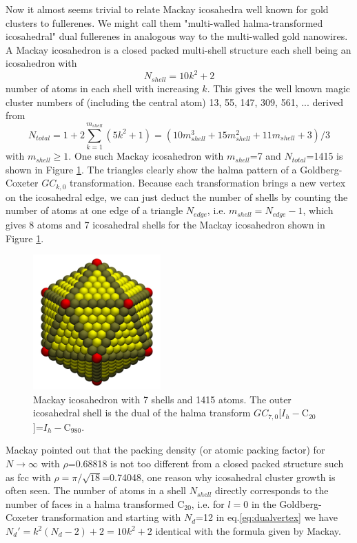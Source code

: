 Now it almost seems trivial to relate Mackay icosahedra\autocite{Mackay-1962} well known for gold clusters\autocite{Nam2002,Wang-Wang-2011} to fullerenes. We might call them "multi-walled halma-transformed icosahedral" dual fullerenes in analogous way to the multi-walled gold nanowires. A Mackay icosahedron is a closed packed multi-shell structure each shell being an icosahedron with
\begin{equation}
  \label{eq:mackay} 
N_{shell}=10k^2+2
\end{equation}
number of atoms in each shell with increasing $k$. This gives the well known magic cluster numbers of (including the central atom) 13, 55, 147, 309, 561, ... derived from
\begin{equation}
  \label{eq:mackaytotal} 
N_{total}=1+2\sum_{k=1}^{m_{shell}}\left( 5k^2+1 \right)=(10m_{shell}^3+15m_{shell}^2+11m_{shell}+3)/3
\end{equation}
with $m_{shell} \ge 1$. One such Mackay icosahedron with $m_{shell}$=7 and $N_{total}$=1415 is shown in Figure \ref{fig:mackaylarge}. The triangles clearly show the halma pattern of a Goldberg-Coxeter $GC_{k,0}$ transformation. Because each transformation brings a new vertex on the icosahedral edge, we can just deduct the number of shells by counting the number of atoms at one edge of a triangle $N_{edge}$, i.e. $m_{shell}=N_{edge}-1$, which gives 8 atoms and 7 icosahedral shells for the Mackay icosahedron shown in Figure \ref{fig:mackaylarge}.
\begin{figure}[htb]
\begin{center}
\includegraphics[width=4.9cm]{golddual/ico.jpg}
\caption{Mackay icosahedron with 7 shells and 1415 atoms. The outer icosahedral shell is the dual of the halma transform $GC_{7,0}$[$I_h-$C$_{20}$]=$I_h-$C$_{980}$.}
\label{fig:mackaylarge}
\end{center}
\end{figure}
Mackay pointed out that the packing density (or atomic packing factor) for $N \rightarrow \infty$ with $\rho$=0.68818 is not too different from a closed packed structure such as fcc with $\rho=\pi/\sqrt{18}$=0.74048,\autocite{Mackay-1962} one reason why icosahedral cluster growth is often seen. The number of atoms in a shell $N_{shell}$ directly corresponds to the number of faces in a halma transformed C$_{20}$, i.e. for $l=0$ in the Goldberg-Coxeter transformation and starting with $N_d$=12 in eq.\ref{eq:dualvertex} we have $N_d'=k^2(N_d-2)+2 = 10k^2+2$ identical with the formula given by Mackay. 

